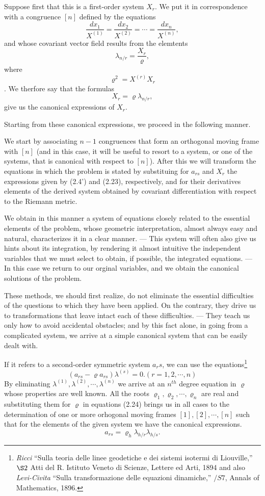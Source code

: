 \documentclass{book}
\begin{document}
Suppose first that this is a first-order system $X_r$. We put it in correspondence with a congruence $[n]$ defined by the equations
$$\frac{dx_1}{X^{(1)}}=\frac{dx_2}{X^{(2)}}=\cdots=\frac{dx_n}{X^{(n)}},$$
and whose covariant vector field results from the elemtents
$$\lambda_{n/r}=\frac{X_r}{\varrho},$$
where
$$\varrho^2=X^{(r)}X_r$$.
We therfore say that the formulas
\begin{equation}
X_r=\varrho\lambda_{n/r},
\end{equation}
give us the canonical expressions of $X_r$. 

Starting from these canonical expressions, we proceed in the following manner. 

We start by associating $n-1$ congruences that form an orthogonal moving frame with $[n]$ (and in this case, it will be useful to resort to a system, or one of the systems, that is canonical with respect to $[n]$). After this we will transform the equations in which the problem is stated by substituing for $a_{rs}$ and $X_r$ the expressions given by (2.4') and (2.23), respectively, and for their derivatives elements of the derived system obtained by covariant differentiation with respect to the Riemann metric. 

We obtain in this manner a system of equations closely related to the essential elements of the problem, whose geometric interpretation, almost always easy and natural, characterizes it in a clear manner. --- This system will often also give us hints about its integration, by rendering it almost intuitive the independent variables that we must select to obtain, if possible, the integrated equations. --- In this case we return to our orginal variables, and we obtain the canonical solutions of the problem. 

These methods, we should first realize, do not eliminate the essential difficulties of the questions to which they have been applied. On the contrary, they drive us to transformations that leave intact each of these difficulties. --- They teach us only how to avoid accidental obstacles; and by this fact alone, in going from a complicated system, we arrive at a simple canonical system that can be easily dealt with. 

If it refers to a second-order symmetric system $a_rs$, we can use the equations\footnote{\emph{Ricci} ``Sulla teoria delle linee geodetiche e dei sistemi isotermi di Liouville,'' $\S2$ Atti del R. Istituto Veneto di Scienze, Lettere ed Arti, 1894 and also \emph{Levi-Civita} ``Sulla transformazione delle equazioni dinamiche,'' $/S7$, Annals of Mathematics, 1896.}
\begin{equation}
(a_{rs}-\varrho	a_{rs})\lambda^{(s)}=0. (r=1,2,\cdots,n)
\end{equation}
By eliminating $\lambda^{(1)},\lambda^{(2)},\cdots,\lambda^{(n)}$ we arrive at an $n^{th}$ degree equation in $\varrho$ whose properties are well known. All the roots $\varrho_1,\varrho_2,\cdots,\varrho_n$ are real and substituting them for $\varrho$ in equations (2.24) brings us in all cases to the determination of one or more orhogonal moving frames $[1],[2],\cdots,[n]$ such that for the elements of the given system we have the canonical expressions. 
$$a_{rs}=\varrho_h\lambda_{h/r}\lambda_{h/s}.$$
\end{document}
